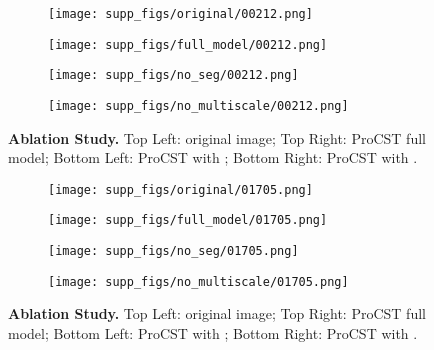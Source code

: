 \documentclass[letterpaper]{article} \usepackage[]{aaai23}  \usepackage{times}  \usepackage{helvet}  \usepackage{courier}  \usepackage[hyphens]{url}  \usepackage{graphicx} \urlstyle{rm} \def\UrlFont{\rm}  \usepackage{natbib}  \usepackage{caption} \frenchspacing  \setlength{\pdfpagewidth}{8.5in} \setlength{\pdfpageheight}{11in} \usepackage{algorithm}
\begin{document}
\begin{figure*}
    \begin{subfigure}{0.5\linewidth}
        \centering
        \texttt{[image: supp\_figs/original/00212.png]}
    \end{subfigure}
    \begin{subfigure}{0.5\linewidth}
        \centering
        \texttt{[image: supp\_figs/full\_model/00212.png]}
    \end{subfigure}
        \begin{subfigure}{0.5\linewidth}
        \centering
        \texttt{[image: supp\_figs/no\_seg/00212.png]}
    \end{subfigure}
    \begin{subfigure}{0.5\linewidth}
        \centering
        \texttt{[image: supp\_figs/no\_multiscale/00212.png]}
    \end{subfigure}
    \caption{\textbf{Ablation Study.} Top Left: original image; Top Right: ProCST full model; Bottom Left: ProCST with ; Bottom Right: ProCST with .}
    \label{ablations_compare_3}
\end{figure*}
\begin{figure*}
    \begin{subfigure}{0.5\linewidth}
        \centering
        \texttt{[image: supp\_figs/original/01705.png]}
    \end{subfigure}
    \begin{subfigure}{0.5\linewidth}
        \centering
        \texttt{[image: supp\_figs/full\_model/01705.png]}
    \end{subfigure}
    \begin{subfigure}{0.5\linewidth}
        \centering
        \texttt{[image: supp\_figs/no\_seg/01705.png]}
    \end{subfigure}
    \begin{subfigure}{0.5\linewidth}
        \centering
        \texttt{[image: supp\_figs/no\_multiscale/01705.png]}
    \end{subfigure}
    \caption{\textbf{Ablation Study.} Top Left: original image; Top Right: ProCST full model; Bottom Left: ProCST with ; Bottom Right: ProCST with .}
    \label{ablations_compare_4}
\end{figure*}
\end{document}
